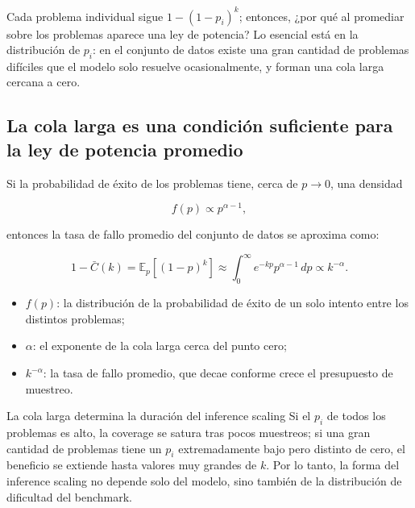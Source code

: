 \documentclass[a4paper]{article}
\begin{document}
Cada problema individual sigue $1-(1-p_i)^k$; entonces, ¿por qué al promediar sobre los problemas aparece una ley de potencia? Lo esencial está en la distribución de $p_i$: en el conjunto de datos existe una gran cantidad de problemas difíciles que el modelo solo resuelve ocasionalmente, y forman una cola larga cercana a cero.


\subsection{La cola larga es una condición suficiente para la ley de potencia promedio}

Si la probabilidad de éxito de los problemas tiene, cerca de $p\rightarrow0$, una densidad

$$
f(p)\propto p^{\alpha-1},
$$

entonces la tasa de fallo promedio del conjunto de datos se aproxima como:

$$
1-\bar C(k)=\mathbb{E}_{p}[(1-p)^k]
\approx\int_{0}^{\infty} e^{-kp}p^{\alpha-1}\,dp
\propto k^{-\alpha}.
$$

\begin{itemize}
    \item $f(p)$: la distribución de la probabilidad de éxito de un solo intento entre los distintos problemas;
    \item $\alpha$: el exponente de la cola larga cerca del punto cero;
    \item $k^{-\alpha}$: la tasa de fallo promedio, que decae conforme crece el presupuesto de muestreo.
\end{itemize}


\begin{importantbox}{La cola larga determina la duración del inference scaling}
Si el $p_i$ de todos los problemas es alto, la coverage se satura tras pocos muestreos; si una gran cantidad de problemas tiene un $p_i$ extremadamente bajo pero distinto de cero, el beneficio se extiende hasta valores muy grandes de $k$. Por lo tanto, la forma del inference scaling no depende solo del modelo, sino también de la distribución de dificultad del benchmark.
\end{importantbox}
\end{document}
